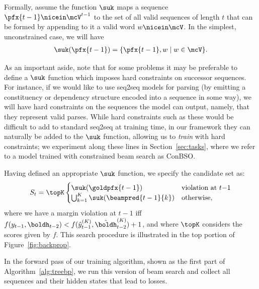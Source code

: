Formally, assume the
function $\suk$ maps a sequence $\pfx{t-1} \nicein \mcV^{t-1}$ to the
set of all valid sequences of length $t$ that can be formed by appending to it a
valid word $w \nicein \mcV$. In the
simplest, unconstrained case, we will have
\begin{align*}
\suk(\pfx{t-1}) = \{\pfx{t-1}, w \mid w \in \mcV \}.
\end{align*}

As an important aside, note that for some problems it may be preferable to define a
$\suk$ function which imposes hard constraints on successor sequences. For instance, if we would like to use seq2seq models for parsing (by emitting a constituency or dependency structure encoded into a sequence in some way), we will have hard constraints on the sequences the model can output, namely, that they represent valid parses. While hard constraints such as these would be difficult to add to standard seq2seq at training time, in our framework they can naturally be added to the $\suk$ function, allowing us to \textit{train} with hard constraints; we experiment along these lines in Section~\ref{sec:tasks}, where we refer to a model trained with constrained beam search as ConBSO. 

Having defined an appropriate $\suk$ function, we specify the candidate set as: 
\begin{align*} \label{eq:stupdate}
S_t =  \topK\begin{cases}  \suk(\goldpfx{t-1}) &\mbox{violation at } t{-}1\\
\bigcup_{k=1}^K \suk(\beampred{t-1}{k}) &\mbox{otherwise}, \end{cases}
\end{align*}
where we have a margin violation at $t{-}1$ iff $f(y_{t-1}, \boldh_{t-2}) < f(\hat{y}_{t-1}^{(K)},\hat{\boldh}_{t-2}^{(K)}) + 1$, and where $\topK$ considers the scores given by $f$. This search procedure is illustrated in the top portion of Figure~\ref{fig:backprop}. 

In the forward pass of our training algorithm, shown as the first part of Algorithm~\ref{alg:treebp}, we run this version of
beam search and collect all sequences and their hidden states that
lead to losses. 

